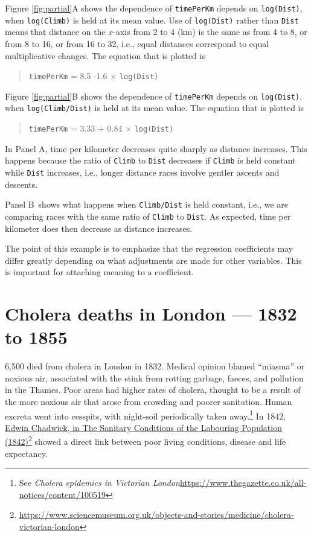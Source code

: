\documentclass[
  10pt,
  b5paper]{book}
\begin{document}
Figure \ref{fig:partial}A shows the dependence of
\texttt{timePerKm} depends on \texttt{log(Dist)}, when \texttt{log(Climb)}
is held at its mean value. Use of \texttt{log(Dist)} rather than
\texttt{Dist} means that distance on the \(x\)-axis from 2 to 4 (km)
is the same as from 4 to 8, or from 8 to 16, or from 16 to 32,
i.e., equal distances correspond to equal multiplicative
changes. The equation that is plotted is

\begin{quote}
\texttt{timePerKm} = 8.5 -1.6 \(\times\) \texttt{log(Dist)}
\end{quote}

Figure \ref{fig:partial}B shows the dependence of
\texttt{timePerKm} depends on \texttt{log(Dist)}, when \texttt{log(Climb/Dist)}
is held at its mean value. The equation that is plotted is

\begin{quote}
\texttt{timePerKm} = 3.33 + 0.84 \(\times\) \texttt{log(Dist)}
\end{quote}

In Panel A, time per kilometer decreases quite sharply as distance
increases. This happens because the ratio of \texttt{Climb} to \texttt{Dist}
decreases if \texttt{Climb} is held constant while \texttt{Dist} increases,
i.e., longer distance races involve gentler ascents and descents.

Panel B~shows what happens when \texttt{Climb/Dist} is held
constant, i.e., we are comparing races with the same ratio of
\texttt{Climb} to \texttt{Dist}. As expected, time per kilometer does then
decrease as distance increases.

The point of this example is to emphasize that the regression
coefficients may differ greatly depending on what adjustments
are made for other variables. This is important for attaching
meaning to a coefficient.

\hypertarget{cholera-deaths-in-london-1832-to-1855}{%
\section{Cholera deaths in London --- 1832 to 1855}\label{cholera-deaths-in-london-1832-to-1855}}

6,500 died from cholera in London in 1832. Medical opinion
blamed ``miasma'' or noxious air, associated with the stink
from rotting garbage, faeces, and pollution in the Thames.
Poor areas had higher rates of cholera, thought to be a
result of the more noxious air that arose from crowding
and poorer sanitation. Human excreta
went into cesspits, with night-soil periodically taken
away.\footnote{See \emph{Cholera epidemics in Victorian London}\newline \url{https://www.thegazette.co.uk/all-notices/content/100519}}
In 1842, \href{https://www.sciencemuseum.org.uk/objects-and-stories/medicine/cholera-victorian-london}{Edwin Chadwick, in The Sanitary Conditions of the Labouring Population (1842)}\footnote{\url{https://www.sciencemuseum.org.uk/objects-and-stories/medicine/cholera-victorian-london}}
showed a direct link between poor living conditions,
disease and life expectancy.
\end{document}
